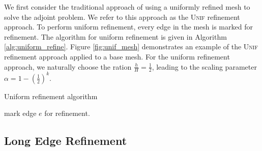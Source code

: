 We first consider the traditional approach of using
a uniformly refined mesh to solve the adjoint problem.
We refer to this approach as the \textsc{Unif}
refinement approach.
To perform uniform refinement, every edge in the mesh
is marked for refinement. The algorithm for uniform
refinement is given in Algorithm \ref{alg:uniform_refine}.
Figure \ref{fig:unif_mesh} demonstrates an example of the
\textsc{Unif} refinement approach applied to a
base mesh. For the uniform refinement approach,
we naturally choose the ration $\frac{h}{H} = \frac12$,
leading to the scaling parameter
$\alpha = 1 - \left( \frac12 \right)^k.$

\begin{algorithm}
\caption{Uniform refinement algorithm}
\begin{algorithmic}
\State mark edge $e$ for refinement.
\EndFor
\end{algorithmic}
\label{alg:uniform_refine}
\end{algorithm}

\subsection{Long Edge Refinement}


